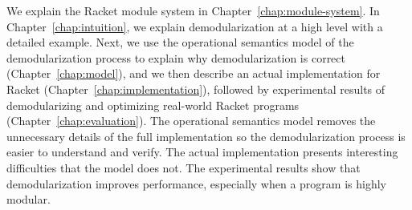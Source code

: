 We explain the Racket module system in Chapter~\ref{chap:module-system}. In Chapter~\ref{chap:intuition}, we explain demodularization at a high level with a detailed example.
Next, we use the operational semantics model of the demodularization process to explain why demodularization is correct (Chapter~\ref{chap:model}), and we then describe an actual implementation for Racket (Chapter~\ref{chap:implementation}), followed by experimental results of demodularizing and optimizing real-world Racket programs (Chapter~\ref{chap:evaluation}). 
The operational semantics model removes the unnecessary details of the full implementation so the demodularization process is easier to understand and verify. 
The actual implementation presents interesting difficulties that the model does not.
The experimental results show that demodularization improves performance, especially when a program is highly modular. 
